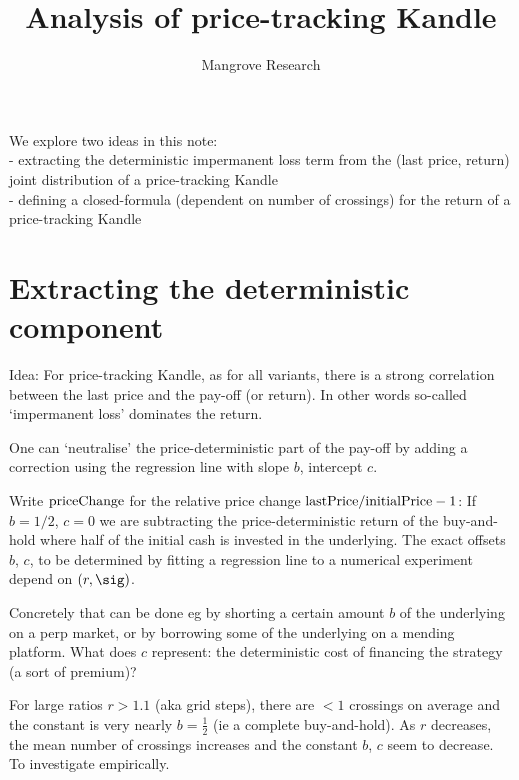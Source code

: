 \documentclass[oneside,twocolumn,12pt]{article}
\title{Analysis of price-tracking Kandle}
\author{Mangrove Research}
\begin{document}
\maketitle
We explore two ideas in this note:
\\- extracting the deterministic impermanent loss term from the 
(last price, return) joint distribution of a price-tracking Kandle
\\- defining a closed-formula (dependent on number of crossings) for
the return of a price-tracking Kandle

\section{Extracting the deterministic component}
Idea: 
For price-tracking Kandle, as for all variants,
there is a strong correlation between the last price and the pay-off (or return).
In other words so-called `impermanent loss' dominates the return.

One can `neutralise' the price-deterministic part of the pay-off by adding 
a correction using the regression line with slope $b$, intercept $c$. 

Write $\hbox{priceChange}$ for the relative price change
$\hbox{lastPrice}/\hbox{initialPrice} - 1$:
If $b=1/2$, $c=0$ we are subtracting the price-deterministic return of the buy-and-hold
where half of the initial cash is invested in the underlying.
The exact offsets $b$, $c$, to be determined by fitting a regression line
to a numerical experiment depend on $(r,\sig)$.

Concretely that can be done eg by shorting a certain amount $b$ of the underlying on a perp market,
or by borrowing some of the underlying on a mending platform. What does $c$ represent: 
the deterministic cost of financing the strategy (a sort of premium)?

For large ratios $r>1.1$ (aka grid steps), 
there are $<1$ crossings on average and the constant is very nearly $b=\frac12$ (ie a complete buy-and-hold).
As $r$ decreases, the mean number of crossings increases and the constant $b$, $c$ seem to decrease.
To investigate empirically.
\end{document}
